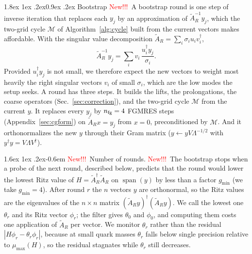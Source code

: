 \documentclass[11pt,a4paper]{article}
\makeatletter
\newcounter{alg}
\newif\ifshownew \shownewtrue
\DeclareRobustCommand\New{\ifshownew\textcolor{red}{New!!!}\ \else\ignorespaces\fi}
\renewcommand\subsubsection{\@startsection{subsubsection}{3}{\z@}%
  {1.8ex \@plus 1ex \@minus .2ex}{0.9ex \@plus .2ex}%
  {\centering\normalfont\small\bfseries\itshape}}
\renewcommand\paragraph{\@startsection{paragraph}{4}{\z@}%
  {1.6ex \@plus 1ex \@minus .2ex}{-0.6em}%
  {\normalfont\normalsize\itshape}}
\numberwithin{equation}{section}
\newcommand{\dg}{^{\dagger}}
\newcommand{\AR}{\tilde A_{R}}
\makeatother
\begin{document}
\subsubsection{Bootstrap}
\label{sec:bootstrap}
\New A bootstrap round is one step of inverse iteration that replaces each
$y_j$ by an approximation of $\AR^{-1}y_j$, which the two-grid cycle $\mathcal M$ of
Algorithm~\ref{alg:cycle} built from the current vectors makes affordable. With the singular value
decomposition $\AR=\sum_i\sigma_iu_iv_i\dg$,
\begin{equation*}
\AR^{-1}y_j=\sum_iv_i\,\frac{u_i\dg y_j}{\sigma_i}.
\end{equation*}
Provided $u_i\dg y_j$ is not small, we therefore expect the new vectors to weight most heavily the
right singular vectors $v_i$ of small $\sigma_i$, which are the low modes the setup seeks. A round
has three steps. It builds the lifts, the prolongations, the
coarse operators (Sec.~\ref{sec:correction}), and the two-grid cycle $\mathcal M$ from the current
$y$. It replaces every $y_j$ by $n_{\rm fg}=4$ FGMRES steps~\cite{SaadFGMRES}
(Appendix~\ref{sec:cgform}) on $\AR x=y_j$ from $x=0$, preconditioned by $\mathcal M$. And it
orthonormalizes the new $y$ through their Gram matrix ($y\leftarrow yV\Lambda^{-1/2}$ with
$y\dg y=V\Lambda V\dg$).

\paragraph{\New Number of rounds.}
\label{sec:autoboot}
\New The bootstrap stops when a probe of the next round, described below, predicts that the round
would lower the lowest Ritz value of $H=\AR\dg\AR$ on $\operatorname{span}(y)$ by less than a factor
$g_{\min}$ (we take $g_{\min}=4$).
After round $r$ the $n$ vectors $y$ are orthonormal, so the Ritz values are the eigenvalues of the
$n\times n$ matrix $(\AR y)\dg(\AR y)$. We call the lowest one $\theta_r$ and its Ritz vector
$\phi_r$; the filter gives $\theta_0$ and $\phi_0$, and computing them costs one application of
$\AR$ per vector. We monitor $\theta_r$ rather than the residual $|H\phi_r-\theta_r\phi_r|$,
because at small quark masses $\theta_r$ falls below single precision relative to $\mu_{\max}(H)$,
so the residual stagnates while $\theta_r$ still decreases.
\end{document}
